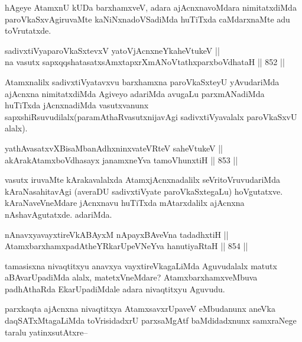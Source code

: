 \begin{artha}
hAgeye AtamxnU kUDa barxhamxveV, adara ajAcnxnavoMdara nimitatxdiMda paroVkaSxvAgiruvaMte kaNiNxnadoVSadiMda huTiTxda caMdarxnaMte adu toVrutatxde.
\end{artha}

\begin{shl}
sadivxtiVyaparoVkaSxtevxV yatoV\s jAcnxneYkaheVtukeV || \\
na vasutx sapxqqshatasatxsAmxtapxrXmANoVtathxparxboVdhataH \hfill || 852 ||  
\end{shl}

\begin{artha}
Atamxnalilx sadivxtiVyatavxvu barxhamxna paroVkaSxteyU yAvudariMda ajAcnxna nimitatxdiMda Agiveyo adariMda avugaLu parxmANadiMda huTiTxda jAcnxnadiMda vasutxvanunx sapxshiRsuvudilalx(paramAthaRvasutxnijavAgi sadivxtiVyavalalx paroVkaSxvU alalx).
\end{artha}

\begin{shl}
yathAvasatxvXBisaMbanAdhxninxvateVRteV saheVtukeV || \\
akArakAtamxboVdhasayx janamxneYva tamoVhunxtiH \hfill || 853 ||  
\end{shl}

\begin{artha}
vasutx iruvaMte kArakavalalxda AtamxjAcnxnadalilx seVritoVruvudariMda kAraNasahitavAgi (averaDU sadivxtiVyate paroVkaSxtegaLu) hoVgutatxve. kAraNaveVneMdare jAcnxnavu huTiTxda mAtarxdalilx ajAcnxna nAshavAgutatxde. adariMda.
\end{artha}


\begin{shl}
nAnavxyavayxtireVkABAyxM nApayxBAveVna tadadhxtiH || \\
AtamxbarxhamxpadAtheYRkarUpeVNeYva hanutiyaRtaH \hfill || 854 ||  
\end{shl}

\begin{artha}
tamasisxna nivaqtitxyu anavxya vayxtireVkagaLiMda Aguvudalalx matutx aBAvarUpadiMda alalx, matetxVneMdare? AtamxbarxhamxveMbuva padhAthaRda EkarUpadiMdale adara nivaqtitxyu Aguvudu.
\end{artha}

\begin{artha}
parxkaqta ajAcnxna nivaqtitxya AtamxsavxrUpaveV eMbudanunx aneVka daqSATxMtagaLiMda toVrisidadxrU parxsaMgAtf baMdidadxnunx samxraNege taralu yatinxsutAtxre{\rm --}
\end{artha}

